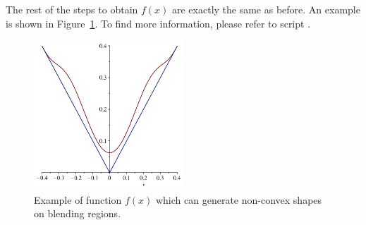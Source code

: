 \documentclass[11pt]{article}
\begin{document}
The rest of the steps to obtain $f(x)$ are exactly the same as before. An example is shown in Figure~\ref{fig:example_f2}. To find more information, please refer to script .
  \begin{figure}[!hbt]
    \begin{center}
      \includegraphics[width=0.5\textwidth]{example_f2}
    \end{center}
    \caption{Example of function $f(x)$ which can generate non-convex shapes on blending regions.}
    \label{fig:example_f2}
  \end{figure}
\end{document}
